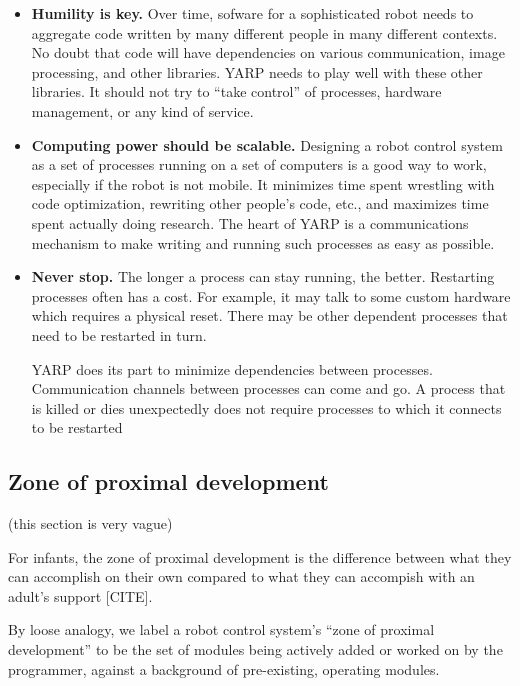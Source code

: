 \begin{itemize}

\item {\bf Humility is key.}
%
Over time, sofware for a sophisticated robot needs to 
aggregate code written by many different people in many
different contexts.  No doubt that code will have
dependencies on various communication, image processing,
and other libraries.
%
YARP needs to play well with these other libraries.
It should not try to ``take control'' of processes,
hardware management, or any kind of service.


\item {\bf Computing power should be scalable.}
%
Designing a robot control system as a set of processes running on
  a set of computers is a good way to work, especially if the robot
  is not mobile.  It minimizes time spent wrestling with code
  optimization, rewriting other people's code, etc., and maximizes
  time spent actually doing research.
  The heart of YARP is a communications mechanism to make writing
  and running such processes as easy as possible.


\item {\bf Never stop.}
%
The longer a process can stay running, the better.  Restarting
  processes often has a cost.  For example, it may talk to some
  custom hardware which requires a physical reset.  There may
  be other dependent processes that need to be restarted in turn.

  YARP does its part to minimize dependencies between processes.
  Communication channels between processes can come and go.
  A process that is killed or dies unexpectedly does not
  require processes to which it connects to be restarted



\end{itemize}


\subsection*{Zone of proximal development}

(this section is very vague)

For infants, the zone of proximal development is the
difference between what they can accomplish on their
own compared to what they can accompish with an
adult's support [CITE].

By loose analogy, we label a robot control system's ``zone of proximal
development'' to be the set of modules being actively added or worked
on by the programmer, against a background of pre-existing, operating
modules.  


